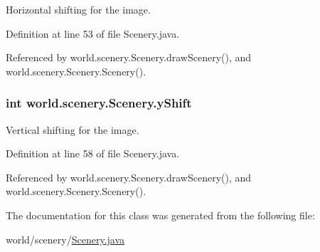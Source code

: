 Horizontal shifting for the image. 



Definition at line 53 of file Scenery.\-java.



Referenced by world.\-scenery.\-Scenery.\-draw\-Scenery(), and world.\-scenery.\-Scenery.\-Scenery().

\hypertarget{classworld_1_1scenery_1_1_scenery_ac9ca2c17cf6920deffe490c013b0e638}{
\subsubsection[{y\-Shift}]{\setlength{\rightskip}{0pt plus 5cm}int world.\-scenery.\-Scenery.\-y\-Shift\hspace{0.3cm}{\ttfamily [protected]}}}\label{classworld_1_1scenery_1_1_scenery_ac9ca2c17cf6920deffe490c013b0e638}


Vertical shifting for the image. 



Definition at line 58 of file Scenery.\-java.



Referenced by world.\-scenery.\-Scenery.\-draw\-Scenery(), and world.\-scenery.\-Scenery.\-Scenery().



The documentation for this class was generated from the following file\-:\begin{DoxyCompactItemize}
\item 
world/scenery/\hyperlink{_scenery_8java}{Scenery.\-java}\end{DoxyCompactItemize}
